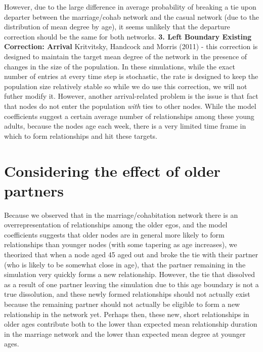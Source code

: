 \documentclass [11pt, proquest] {uwthesis}[2015/03/03]
\begin{document}
However, due to the large difference in average probability of breaking
a tie upon departer between the marriage/cohab network and the casual
network (due to the distribution of mean degree by age), it seems
unlikely that the departure correction should be the same for both
networks. \textbf{3. Left Boundary Existing Correction: Arrival}
Kritvitsky, Handcock and Morris (2011) - this correction is designed to
maintain the target mean degree of the network in the presence of
changes in the size of the population. In these simulations, while the
exact number of entries at every time step is stochastic, the rate is
designed to keep the population size relatively stable so while we do
use this correction, we will not futher modify it. However, another
arrival-related problem is the issue is that fact that nodes do not
enter the population \emph{with} ties to other nodes. While the model
coefficients suggest a certain average number of relationships among
these young adults, because the nodes age each week, there is a very
limited time frame in which to form relationships and hit these targets.

\section{Considering the effect of older
partners}\label{considering-the-effect-of-older-partners}

Because we observed that in the marriage/cohabitation network there is
an overrepresentation of relationships among the older egos, and the
model coefficients suggests that older nodes are in general more likely
to form relationships than younger nodes (with some tapering as age
increases), we theorized that when a node aged 45 aged out and broke the
tie with their partner (who is likely to be somewhat close in age), that
the partner remaining in the simulation very quickly forms a new
relationship. However, the tie that dissolved as a result of one partner
leaving the simulation due to this age boundary is not a true
dissolution, and these newly formed relationships should not actually
exist because the remaining partner should not actually be eligible to
form a new relationship in the network yet. Perhaps then, these new,
short relationships in older ages contribute both to the lower than
expected mean relationship duration in the marriage network and the
lower than expected mean degree at younger ages.
\end{document}
